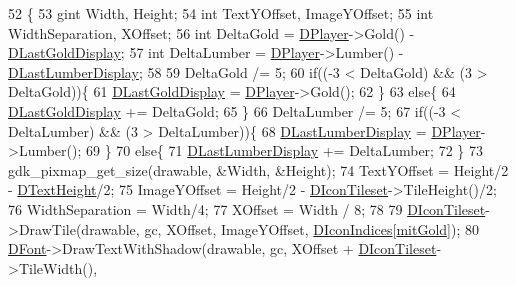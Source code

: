 \begin{DoxyCode}
52                                                                      \{
53     gint Width, Height;
54     \textcolor{keywordtype}{int} TextYOffset, ImageYOffset;
55     \textcolor{keywordtype}{int} WidthSeparation, XOffset;
56     \textcolor{keywordtype}{int} DeltaGold = \hyperlink{classCResourceRenderer_ad8479113a1d9b1ab1a134ca86bc823e0}{DPlayer}->Gold() - \hyperlink{classCResourceRenderer_ae96b899e2b8f19105a6e5d1e2f741abd}{DLastGoldDisplay};
57     \textcolor{keywordtype}{int} DeltaLumber = \hyperlink{classCResourceRenderer_ad8479113a1d9b1ab1a134ca86bc823e0}{DPlayer}->Lumber() - \hyperlink{classCResourceRenderer_a9e2658ecff79b486956e118114a2fb52}{DLastLumberDisplay};
58     
59     DeltaGold /= 5;
60     \textcolor{keywordflow}{if}((-3 < DeltaGold) && (3 > DeltaGold))\{
61         \hyperlink{classCResourceRenderer_ae96b899e2b8f19105a6e5d1e2f741abd}{DLastGoldDisplay} = \hyperlink{classCResourceRenderer_ad8479113a1d9b1ab1a134ca86bc823e0}{DPlayer}->Gold();
62     \}
63     \textcolor{keywordflow}{else}\{
64         \hyperlink{classCResourceRenderer_ae96b899e2b8f19105a6e5d1e2f741abd}{DLastGoldDisplay} += DeltaGold; 
65     \}
66     DeltaLumber /= 5;
67     \textcolor{keywordflow}{if}((-3 < DeltaLumber) && (3 > DeltaLumber))\{
68         \hyperlink{classCResourceRenderer_a9e2658ecff79b486956e118114a2fb52}{DLastLumberDisplay} = \hyperlink{classCResourceRenderer_ad8479113a1d9b1ab1a134ca86bc823e0}{DPlayer}->Lumber();
69     \}
70     \textcolor{keywordflow}{else}\{
71         \hyperlink{classCResourceRenderer_a9e2658ecff79b486956e118114a2fb52}{DLastLumberDisplay} += DeltaLumber; 
72     \}    
73     gdk\_pixmap\_get\_size(drawable, &Width, &Height); 
74     TextYOffset = Height/2 - \hyperlink{classCResourceRenderer_a7674293a7af59bfc3a75f57e729d9a6f}{DTextHeight}/2;
75     ImageYOffset = Height/2 - \hyperlink{classCResourceRenderer_a6a4bc80e88c35798259d3235785a1a5f}{DIconTileset}->TileHeight()/2;
76     WidthSeparation = Width/4;
77     XOffset = Width / 8;
78     
79     \hyperlink{classCResourceRenderer_a6a4bc80e88c35798259d3235785a1a5f}{DIconTileset}->DrawTile(drawable, gc, XOffset, ImageYOffset, 
      \hyperlink{classCResourceRenderer_a18c32c2685ee404dc0177b977fb2da59}{DIconIndices}[\hyperlink{ResourceRenderer_8cpp_ab27b08cd0a54e12064fc6ddb3733a91ba7adf8c9c4baae104b28012b03306bc46}{mitGold}]);
80     \hyperlink{classCResourceRenderer_acd1383d226622757afdcdcf6d9747aa0}{DFont}->DrawTextWithShadow(drawable, gc, XOffset +  \hyperlink{classCResourceRenderer_a6a4bc80e88c35798259d3235785a1a5f}{DIconTileset}->TileWidth(), 

\end{DoxyCode}
